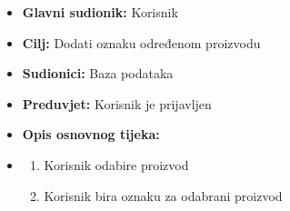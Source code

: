                         \noindent {}
					\begin{itemize}
	
						\item \textbf{Glavni sudionik: }Korisnik
						\item  \textbf{Cilj:} Dodati oznaku određenom proizvodu
						\item  \textbf{Sudionici:} Baza podataka
						\item  \textbf{Preduvjet:} Korisnik je prijavljen
						\item  \textbf{Opis osnovnog tijeka:}
						
						\item[] \begin{enumerate}
							\item Korisnik odabire proizvod
                                \item Korisnik bira oznaku za odabrani proizvod\\
						\end{enumerate}

					\end{itemize}

